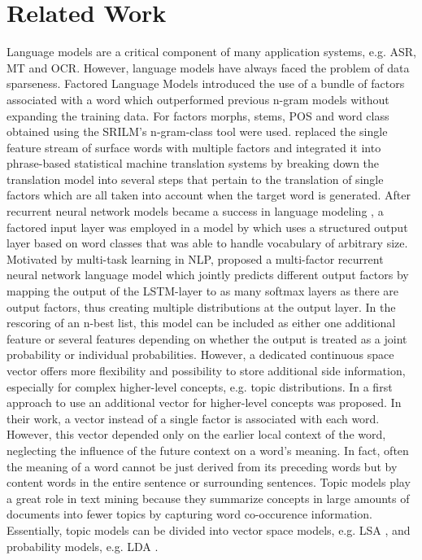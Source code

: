 \documentclass[a4paper]{article}
\begin{document}
\section{Related Work}
Language models are a critical component of many application systems, e.g. ASR, MT and OCR. However, language models have always faced the problem of data sparseness. Factored Language Models \cite{bilmes2003factored} introduced the use of a bundle of factors associated with a word which outperformed previous n-gram models without expanding the training data. For factors morphs, stems, POS and word class obtained using the SRILM's n-gram-class tool were used. \cite{koehn2007factored} replaced the single feature stream of surface words with multiple factors and integrated it into phrase-based statistical machine translation systems by breaking down the translation model into several steps that pertain to the translation of single factors which are all taken into account when the target word is generated.
After recurrent neural network models became a success in language modeling \cite{mikolov2010recurrent}, a factored input layer was employed in a model by \cite{wu2012factored} which uses a structured output layer based on word classes that was able to handle vocabulary of arbitrary size.
Motivated by multi-task learning in NLP, \cite{niehuesusing} proposed a multi-factor recurrent neural network language model which jointly predicts different output factors by mapping the output of the LSTM-layer to as many softmax layers as there are output factors, thus creating multiple distributions at the output layer. In the rescoring of an n-best list, this model can be included as either one additional feature or several features depending on whether the output is treated as a joint probability or individual probabilities.
However, a dedicated continuous space vector offers more flexibility and possibility to store additional side information, especially for complex higher-level concepts, e.g. topic distributions. In \cite{mikolov2012context} a first approach to use an additional vector for higher-level concepts was proposed. In their work, a vector instead of a single factor is associated with each word. However, this vector depended only on the  earlier local context of the word, neglecting the influence of the future context on a word's meaning. 
In fact, often the meaning of a word cannot be just derived from its preceding words but by content words in the entire sentence or surrounding sentences. 
Topic models play a great role in text mining because they summarize concepts in large amounts of documents into fewer topics by capturing word co-occurence information. Essentially, topic models can be divided into vector space models, e.g. LSA \cite{deerwester1990indexing}, and probability models, e.g. LDA \cite{blei2003latent}. 
\end{document}

